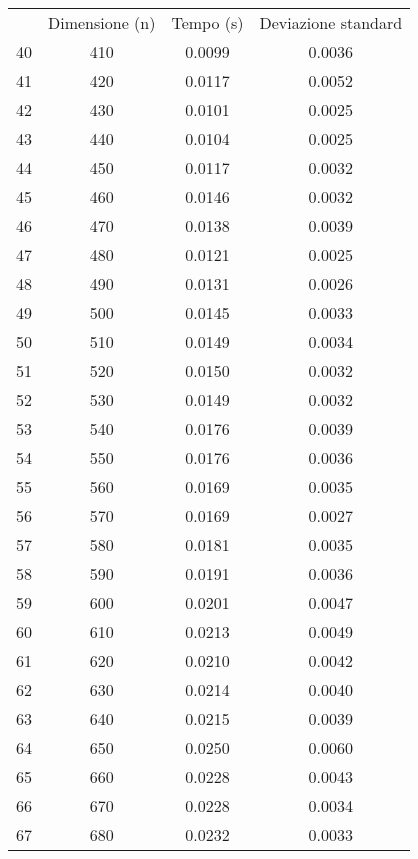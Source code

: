 \begin{table}
\centering
\begin{adjustbox}{width=1\textwidth/2}
\begin{tabular}{|c|c|c|c|}
\hline
 & Dimensione (n) & Tempo (s) & Deviazione standard \\
40 & 410 & 0.0099 & 0.0036 \\
\cline{1-4}
41 & 420 & 0.0117 & 0.0052 \\
\cline{1-4}
42 & 430 & 0.0101 & 0.0025 \\
\cline{1-4}
43 & 440 & 0.0104 & 0.0025 \\
\cline{1-4}
44 & 450 & 0.0117 & 0.0032 \\
\cline{1-4}
45 & 460 & 0.0146 & 0.0032 \\
\cline{1-4}
46 & 470 & 0.0138 & 0.0039 \\
\cline{1-4}
47 & 480 & 0.0121 & 0.0025 \\
\cline{1-4}
48 & 490 & 0.0131 & 0.0026 \\
\cline{1-4}
49 & 500 & 0.0145 & 0.0033 \\
\cline{1-4}
50 & 510 & 0.0149 & 0.0034 \\
\cline{1-4}
51 & 520 & 0.0150 & 0.0032 \\
\cline{1-4}
52 & 530 & 0.0149 & 0.0032 \\
\cline{1-4}
53 & 540 & 0.0176 & 0.0039 \\
\cline{1-4}
54 & 550 & 0.0176 & 0.0036 \\
\cline{1-4}
55 & 560 & 0.0169 & 0.0035 \\
\cline{1-4}
56 & 570 & 0.0169 & 0.0027 \\
\cline{1-4}
57 & 580 & 0.0181 & 0.0035 \\
\cline{1-4}
58 & 590 & 0.0191 & 0.0036 \\
\cline{1-4}
59 & 600 & 0.0201 & 0.0047 \\
\cline{1-4}
60 & 610 & 0.0213 & 0.0049 \\
\cline{1-4}
61 & 620 & 0.0210 & 0.0042 \\
\cline{1-4}
62 & 630 & 0.0214 & 0.0040 \\
\cline{1-4}
63 & 640 & 0.0215 & 0.0039 \\
\cline{1-4}
64 & 650 & 0.0250 & 0.0060 \\
\cline{1-4}
65 & 660 & 0.0228 & 0.0043 \\
\cline{1-4}
66 & 670 & 0.0228 & 0.0034 \\
\cline{1-4}
67 & 680 & 0.0232 & 0.0033 \\
\cline{1-4}

\end{tabular}
\end{adjustbox}
\end{table}
